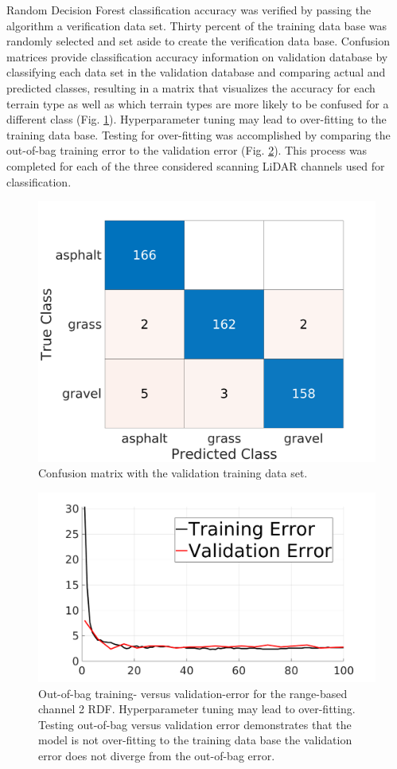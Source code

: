 \documentclass[numbered,pdftex]{ohio-etd}
\begin{document}
{{{{				{Random Decision Forest classification accuracy was verified by passing the algorithm a verification data set. Thirty percent of the training data base was randomly selected and set aside to create the verification data base. Confusion matrices provide classification accuracy information on validation database by classifying each data set in the validation database and comparing actual and predicted classes, resulting in a matrix that visualizes the accuracy for each terrain type as well as which terrain types are more likely to be confused for a different class (Fig. \ref{fig:vali_err_conf_mat_range}). Hyperparameter tuning may lead to over-fitting to the training data base. Testing for over-fitting was accomplished by comparing the out-of-bag training error to the validation error (Fig. \ref{fig:train_vs_valid_overfit_test2}). This process was completed for each of the three considered scanning LiDAR channels used for classification. }
								
				\begin{figure}[H]
					\centering
					\includegraphics[width=0.65\linewidth]{Defense_Images/chan_2c_conf_VALIDATION_mat222}
					\caption[Validation Error]{Confusion matrix with the validation training data set.}
					\label{fig:vali_err_conf_mat_range}
				\end{figure}
			
				\begin{figure}[H]
					\centering
					\includegraphics[width=0.75\linewidth]{Defense_Images/train_vs_valid_overfit_test2}
					\caption[Training vs Validation Error]{Out-of-bag training- versus validation-error for the range-based channel 2 RDF. Hyperparameter tuning may lead to over-fitting. Testing out-of-bag versus validation error demonstrates that the model is not over-fitting to the training data base the validation error does not diverge from the out-of-bag error.}
					\label{fig:train_vs_valid_overfit_test2}
				\end{figure}
					


}}}}
\end{document}
